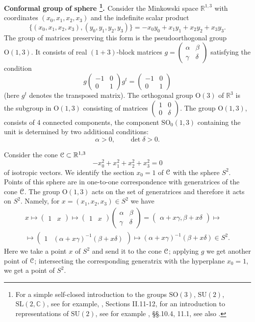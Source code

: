 \documentclass[10pt,a4paper]{amsart}
\newcounter{sec}
\newcounter{punct}[sec]
\def\punct{\refstepcounter{punct}{\arabic{sec}.\arabic{punct}.  }}
\def\SL{\mathrm {SL}}
\def\SU{\mathrm {SU}}
\def\SO{\mathrm  {SO}}
\renewcommand\O{\mathrm{O}}
\def\cC{\EuScript C}
\def\R {{\mathbb R }}
\def\C {{\mathbb C }}
\def\ov{\overline}
\def\wt{\widetilde}
\def\sm{\smallskip}
\def\0{{\ov 0}}
\begin{document}
\sm

{\bf\punct Conformal group of sphere%
\footnote{For a simple self-closed introduction
 to the groups $\SO(3)$, $\SU(2)$,
 $\SL(2,\C)$,
see for example, \cite{KM}, Sections II.11-12, for an introduction to representations of
$\SU(2)$, see for example \cite{FH}, \S\S.10.4, 11.1, see also \cite{GMS}.}.%
\label{ss:conformal-sphere}}
 Consider the Minkowski space $\R^{1,3}$
 with coordinates $(x_0,x_1,x_2,x_3)$ and the indefinite scalar product
$$
\bigl\{ (x_0,x_1,x_2,x_3),(y_0,y_1,y_2,y_3)\bigr\}
=-x_0y_0+x_1y_1+x_2y_2+x_3y_3.
$$
The group of matrices preserving this form is the pseudoorthogonal 
group $\O(1,3)$. It consists of real $(1+3)$-block matrices 
$g=\begin{pmatrix}\alpha&\beta\\\gamma&\delta\end{pmatrix}$ satisfying the condition
$$
g\begin{pmatrix}-1&0\\0&1\end{pmatrix} g^t=\begin{pmatrix}-1&0\\0&1\end{pmatrix}
$$
(here $g^t$ denotes the transposed matrix). The orthogonal group
$\O(3)$ of $\R^3$ is the subgroup in $\O(1,3)$ consisting of matrices
$\begin{pmatrix}1&0\\0&\delta\end{pmatrix}$.
The group $\O(1,3)$, consists of 4  connected components,
 the component $\SO_0(1,3)$ containing the unit is
  determined by two additional conditions:
$$
\alpha>0, \qquad \det \delta>0.
$$

Consider the cone $\cC\subset \R^{1,3}$  
$$
-x_0^2+x_1^2+x_2^2+x_3^2=0
$$
 of isotropic vectors. We identify the section $x_0=1$ of $\cC$
with the sphere $S^2$. Points of this sphere are in one-to-one correspondence
with generatrices of the cone $\cC$.
The group $\O(1,3)$ acts on the set of generatrices and therefore
it acts on $S^2$. Namely, for $x=(x_1,x_2,x_3)\in S^2$
we have
\begin{multline*}
x\mapsto \begin{pmatrix}1&x\end{pmatrix}
\mapsto
 \begin{pmatrix}1&x\end{pmatrix} \begin{pmatrix}\alpha&\beta\\\gamma&\delta\end{pmatrix}
=\begin{pmatrix}\alpha+x\gamma,\beta+x\delta\end{pmatrix}\mapsto
\\
\mapsto 
\begin{pmatrix}1&(\alpha+x\gamma)^{-1}(\beta+x\delta)\end{pmatrix}\mapsto (\alpha+x\gamma)^{-1}(\beta+x\delta)\in S^2.
\end{multline*}
Here we take a point $x$ of $S^2$ and send it to the cone $\cC$;
applying $g$ we get another point   of $\cC$;
intersecting the corresponding generatrix with the hyperplane
$x_0=1$, we get a point of $S^2$.
 
\end{document}
